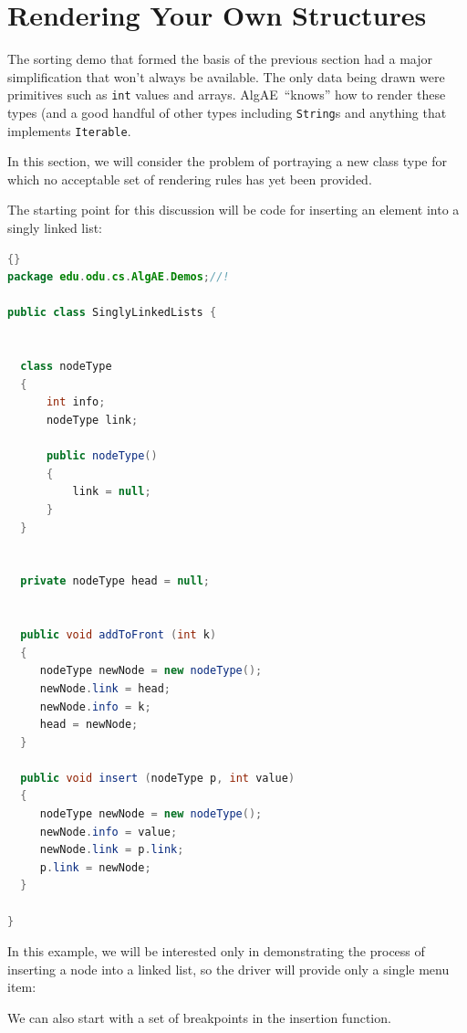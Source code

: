 \documentclass[11pt,titlepage]{book}
\newcommand{\algae}{{\sc AlgAE}}
\begin{document}
\section{Rendering Your Own Structures}\label{rendering}

The sorting demo that formed the basis of the previous section had a
major simplification that won't always be available. The only data
being drawn were primitives such as \texttt{int} values and
arrays. \algae\ ``knows'' how to render these types (and a good
handful of other types including \texttt{String}s and anything that
implements \texttt{Iterable}.

In this section, we will consider the problem of portraying a new class
type for which no acceptable set of rendering rules has yet been
provided.

The starting point for this discussion will be code for inserting an element into a singly linked list:
\begin{lstlisting}[language=Java,frame=tb]{}
package edu.odu.cs.AlgAE.Demos;//!

public class SinglyLinkedLists {


  class nodeType
  {
      int info;
      nodeType link;

      public nodeType()
      {
          link = null;
      }
  }


  private nodeType head = null;


  public void addToFront (int k)
  {
     nodeType newNode = new nodeType();
     newNode.link = head;
     newNode.info = k;
     head = newNode;
  }

  public void insert (nodeType p, int value)
  {
     nodeType newNode = new nodeType();
     newNode.info = value;
     newNode.link = p.link;
     p.link = newNode;
  }
     
}
\end{lstlisting}

In this example, we will be interested only in demonstrating the process of inserting a node into a linked list, so the driver will provide only a single menu item:



We can also start with a set of breakpoints in the insertion function.

\end{document}
